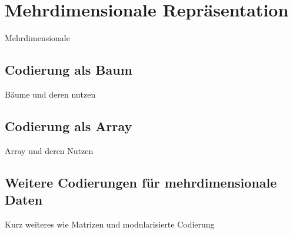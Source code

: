 
\section{Mehrdimensionale Repräsentation}
\label{sec:MehrdimRep}

Mehrdimensionale

\subsection{Codierung als Baum}
\label{sec:BaumCod}

	Bäume und deren nutzen

\subsection{Codierung als Array}
\label{sec:ArrayCod}

	Array und deren Nutzen

\subsection{Weitere Codierungen für mehrdimensionale Daten}
\label{sec:WeitereMehrdim}

	Kurz weiteres wie Matrizen und modularisierte Codierung
